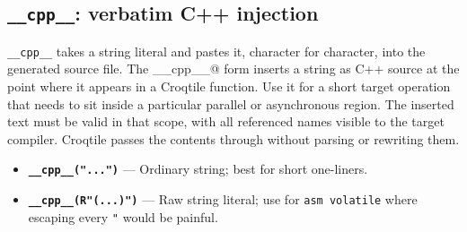 \subsection*{\texttt{\_\_cpp\_\_}: verbatim C++ injection}

\texttt{\_\_cpp\_\_} takes a string literal and pastes it, character for character, into the generated source file. The \co@__cpp__@ form inserts a string as C++ source at the point where it appears in a Croqtile function. Use it for a short target operation that needs to sit inside a particular parallel or asynchronous region. The inserted text must be valid in that scope, with all referenced names visible to the target compiler. Croqtile passes the contents through without parsing or rewriting them.

\begin{itemize}[leftmargin=1.6em]
\item \textbf{\texttt{\_\allowbreak{}\_\allowbreak{}cpp\_\allowbreak{}\_\allowbreak{}(".\allowbreak{}.\allowbreak{}.\allowbreak{}")}} --- Ordinary string; best for short one-liners.
\item \textbf{\texttt{\_\allowbreak{}\_\allowbreak{}cpp\_\allowbreak{}\_\allowbreak{}(R"(.\allowbreak{}.\allowbreak{}.\allowbreak{})")}} --- Raw string literal; use for \texttt{asm volatile} where escaping every \texttt{"} would be painful.
\end{itemize}
